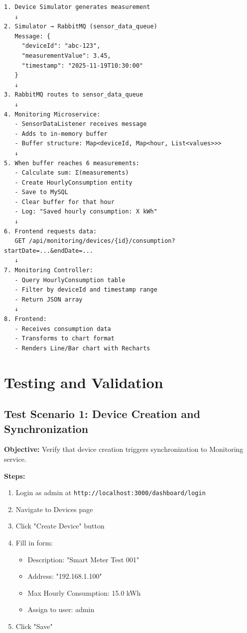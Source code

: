 \documentclass[12pt,a4paper]{article}
\begin{document}
\begin{verbatim}
1. Device Simulator generates measurement
   ↓
2. Simulator → RabbitMQ (sensor_data_queue)
   Message: {
     "deviceId": "abc-123",
     "measurementValue": 3.45,
     "timestamp": "2025-11-19T10:30:00"
   }
   ↓
3. RabbitMQ routes to sensor_data_queue
   ↓
4. Monitoring Microservice:
   - SensorDataListener receives message
   - Adds to in-memory buffer
   - Buffer structure: Map<deviceId, Map<hour, List<values>>>
   ↓
5. When buffer reaches 6 measurements:
   - Calculate sum: Σ(measurements)
   - Create HourlyConsumption entity
   - Save to MySQL
   - Clear buffer for that hour
   - Log: "Saved hourly consumption: X kWh"
   ↓
6. Frontend requests data:
   GET /api/monitoring/devices/{id}/consumption?startDate=...&endDate=...
   ↓
7. Monitoring Controller:
   - Query HourlyConsumption table
   - Filter by deviceId and timestamp range
   - Return JSON array
   ↓
8. Frontend:
   - Receives consumption data
   - Transforms to chart format
   - Renders Line/Bar chart with Recharts
\end{verbatim}

\newpage


\section{Testing and Validation}

\subsection{Test Scenario 1: Device Creation and Synchronization}

\textbf{Objective:} Verify that device creation triggers synchronization to Monitoring service.

\textbf{Steps:}
\begin{enumerate}
    \item Login as admin at \texttt{http://localhost:3000/dashboard/login}
    \item Navigate to Devices page
    \item Click "Create Device" button
    \item Fill in form:
    \begin{itemize}
        \item Description: "Smart Meter Test 001"
        \item Address: "192.168.1.100"
        \item Max Hourly Consumption: 15.0 kWh
        \item Assign to user: admin
    \end{itemize}
    \item Click "Save"
\end{enumerate}
\end{document}
